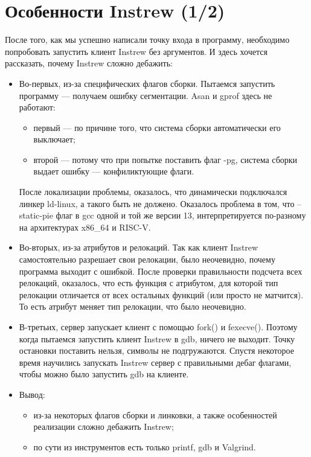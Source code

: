 \section{Особенности Instrew (1/2)}
После того, как мы успешно написали точку входа в программу, необходимо попробовать запустить клиент Instrew без аргументов. И здесь хочется рассказать, почему Instrew сложно дебажить:
\begin{itemize}
    \item Во-первых, из-за специфических флагов сборки. Пытаемся запустить программу --- получаем ошибку сегментации. Asan и gprof здесь не работают:
    \begin{itemize} 
	\item первый --- по причине того, что система сборки автоматически его выключает;
	\item второй --- потому что при попытке поставить флаг -pg, система сборки выдает ошибку --- конфиликтующие флаги.
    \end{itemize}
    После локализации проблемы, оказалось, что динамически подключался линкер ld-linux, а такого быть не должено. Оказалось проблема в том, что --static-pie флаг в gcc одной и той же версии 13, интерпретируется по-разному на архитектурах x86\_64 и RISC-V.
    \item Во-вторых, из-за атрибутов и релокаций. Так как клиент Instrew самостоятельно разрешает свои релокации, было неочевидно, почему программа выходит с ошибкой. После проверки правильности подсчета всех релокаций, оказалось, что есть функция с атрибутом, для которой тип релокации отличается от всех остальных функций (или просто не матчится). То есть атрибут меняет тип релокации, что было неочевидно.
    \item В-третьих, сервер запускает клиент с помощью fork() и fexecve(). Поэтому когда пытаемся запустить клиент Instrew в gdb, ничего не выходит. Точку остановки поставить нельзя, символы не подгружаются. Спустя некоторое время научились запускать Instrew сервер с правильными дебаг флагами, чтобы можно было запустить gdb на клиенте.
    \item Вывод:
	\begin{itemize}
	    \item из-за некоторых флагов сборки и линковки, а также особенностей реализации сложно дебажить Instrew;
	    \item по сути из инструментов есть только printf, gdb и Valgrind.
	\end{itemize}

\end{itemize}

